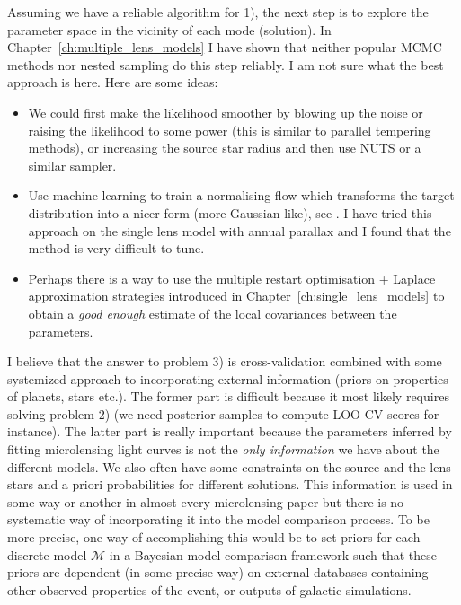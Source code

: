 \documentclass[12pt,dvipsnames]{report}
\begin{document}
Assuming we have a reliable algorithm for 1), the next step is to explore the parameter 
space in the vicinity of each mode (solution). In Chapter~\ref{ch:multiple_lens_models} I 
have shown that neither popular MCMC methods nor nested sampling do this step reliably. 
I am not sure what the best approach is here. Here are some ideas:
\begin{itemize}
    \item We could first make the likelihood smoother by blowing up the noise or raising the 
    likelihood to some power (this is similar to parallel tempering methods), or 
    increasing the source star radius and then use NUTS or a similar sampler. 
    \item Use machine learning to train a normalising flow which transforms the target 
    distribution into a nicer form (more Gaussian-like), see \citet{arXiv:1903.03704}. 
    I have tried this approach on the single lens model with annual parallax and I found 
    that the method is very difficult to tune.
    \item Perhaps there is a way to use the multiple restart optimisation + Laplace approximation 
    strategies introduced in Chapter~\ref{ch:single_lens_models} to obtain a \emph{good enough}
    estimate of the local covariances between the parameters.
\end{itemize}

I believe that the answer to problem 3) is cross-validation combined with some systemized approach to 
incorporating external information (priors on properties of planets, stars etc.). The 
former part is difficult because it most likely requires solving problem 2) (we need 
posterior samples to compute LOO-CV scores for instance). The latter part is really 
important  because the parameters inferred by fitting microlensing light curves 
is not the \emph{only information} we have about the different models.
We also often have some constraints on the source and the lens stars and a priori probabilities
for different solutions. This information is used in some way or another in almost every 
microlensing paper but there is no systematic way of incorporating it 
into the model comparison process. To be more precise, one way of accomplishing this would be 
to set priors for each discrete model $\mathcal{M}$ in a Bayesian model comparison 
framework such that these priors are dependent (in some precise way) on external 
databases containing other observed properties of the event, or outputs of galactic 
simulations. 
\end{document}
